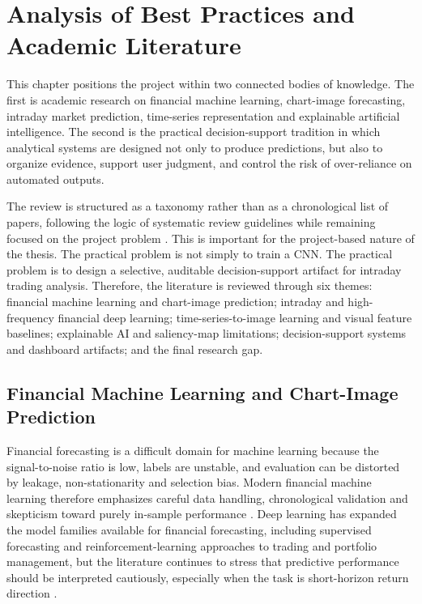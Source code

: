 
\section{Analysis of Best Practices and Academic Literature}
\label{sec:literature}

This chapter positions the project within two connected bodies of knowledge. The first is academic research on financial machine learning, chart-image forecasting, intraday market prediction, time-series representation and explainable artificial intelligence. The second is the practical decision-support tradition in which analytical systems are designed not only to produce predictions, but also to organize evidence, support user judgment, and control the risk of over-reliance on automated outputs.

The review is structured as a taxonomy rather than as a chronological list of papers, following the logic of systematic review guidelines while remaining focused on the project problem \cite{kitchenham_slr,prisma2020}. This is important for the project-based nature of the thesis. The practical problem is not simply to train a CNN. The practical problem is to design a selective, auditable decision-support artifact for intraday trading analysis. Therefore, the literature is reviewed through six themes: financial machine learning and chart-image prediction; intraday and high-frequency financial deep learning; time-series-to-image learning and visual feature baselines; explainable AI and saliency-map limitations; decision-support systems and dashboard artifacts; and the final research gap.

\subsection{Financial Machine Learning and Chart-Image Prediction}
\label{subsec:financial_ml_chart_images}




Financial forecasting is a difficult domain for machine learning because the signal-to-noise ratio is low, labels are unstable, and evaluation can be distorted by leakage, non-stationarity and selection bias. Modern financial machine learning therefore emphasizes careful data handling, chronological validation and skepticism toward purely in-sample performance \cite{lopez_de_prado_afml,bailey_deflated_sharpe,bailey_probabilistic_sharpe}. Deep learning has expanded the model families available for financial forecasting, including supervised forecasting and reinforcement-learning approaches to trading and portfolio management, but the literature continues to stress that predictive performance should be interpreted cautiously, especially when the task is short-horizon return direction \cite{heaton_deep_learning_finance,sezer_financial_forecasting_survey,lim_zohren_time_series_forecasting,jiang_portfolio_drl,moody_direct_reinforcement}.


